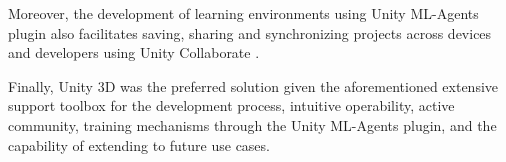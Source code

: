 Moreover, the development of learning environments using Unity ML-Agents plugin also facilitates saving, sharing and synchronizing projects across devices and developers using 
Unity Collaborate \cite{unity-collaborate}.

Finally, Unity 3D was the preferred solution given the aforementioned extensive support toolbox for the development process, intuitive operability, active community, training mechanisms through the Unity ML-Agents plugin, and the capability of extending to future use cases.







